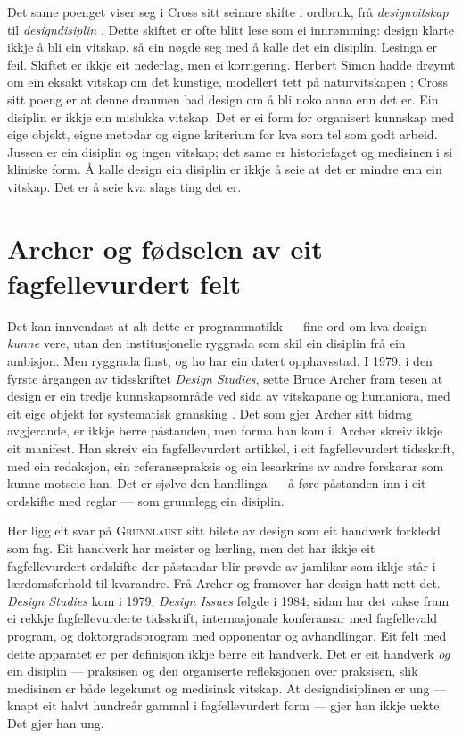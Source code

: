 Det same poenget viser seg i Cross sitt seinare skifte i ordbruk, frå \emph{designvitskap} til \emph{designdisiplin} \autocite{cross2001discipline}. Dette skiftet er ofte blitt lese som ei innrømming: design klarte ikkje å bli ein vitskap, så ein nøgde seg med å kalle det ein disiplin. Lesinga er feil. Skiftet er ikkje eit nederlag, men ei korrigering. Herbert Simon hadde drøymt om ein eksakt vitskap om det kunstige, modellert tett på naturvitskapen \autocite{simon1969sciences}; Cross sitt poeng er at denne draumen bad design om å bli noko anna enn det er. Ein disiplin er ikkje ein mislukka vitskap. Det er ei form for organisert kunnskap med eige objekt, eigne metodar og eigne kriterium for kva som tel som godt arbeid. Jussen er ein disiplin og ingen vitskap; det same er historiefaget og medisinen i si kliniske form. Å kalle design ein disiplin er ikkje å seie at det er mindre enn ein vitskap. Det er å seie kva slags ting det er.

\section{Archer og fødselen av eit fagfellevurdert felt}

Det kan innvendast at alt dette er programmatikk — fine ord om kva design \emph{kunne} vere, utan den institusjonelle ryggrada som skil ein disiplin frå ein ambisjon. Men ryggrada finst, og ho har ein datert opphavsstad. I 1979, i den fyrste årgangen av tidsskriftet \emph{Design Studies}, sette Bruce Archer fram tesen at design er ein tredje kunnskapsområde ved sida av vitskapane og humaniora, med eit eige objekt for systematisk gransking \autocite{archer1979discipline}. Det som gjer Archer sitt bidrag avgjerande, er ikkje berre påstanden, men forma han kom i. Archer skreiv ikkje eit manifest. Han skreiv ein fagfellevurdert artikkel, i eit fagfellevurdert tidsskrift, med ein redaksjon, ein referansepraksis og ein lesarkrins av andre forskarar som kunne motseie han. Det er sjølve den handlinga — å føre påstanden inn i eit ordskifte med reglar — som grunnlegg ein disiplin.

Her ligg eit svar på \textsc{Grunnlaust} sitt bilete av design som eit handverk forkledd som fag. Eit handverk har meister og lærling, men det har ikkje eit fagfellevurdert ordskifte der påstandar blir prøvde av jamlikar som ikkje står i lærdomsforhold til kvarandre. Frå Archer og framover har design hatt nett det. \emph{Design Studies} kom i 1979; \emph{Design Issues} følgde i 1984; sidan har det vakse fram ei rekkje fagfellevurderte tidsskrift, internasjonale konferansar med fagfellevald program, og doktorgradsprogram med opponentar og avhandlingar. Eit felt med dette apparatet er per definisjon ikkje berre eit handverk. Det er eit handverk \emph{og} ein disiplin — praksisen og den organiserte refleksjonen over praksisen, slik medisinen er både legekunst og medisinsk vitskap. At designdisiplinen er ung — knapt eit halvt hundreår gammal i fagfellevurdert form — gjer han ikkje uekte. Det gjer han ung.

